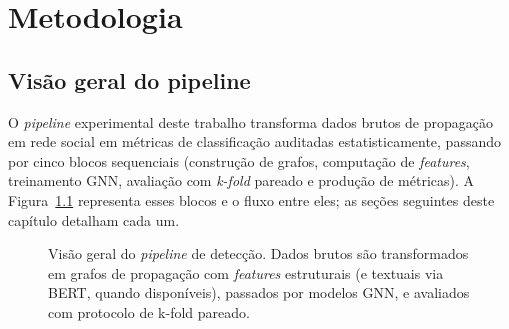 
\chapter{Metodologia}
\label{cap:metodologia}

\section{Vis\~ao geral do pipeline}
\label{sec:pipeline}

O \emph{pipeline} experimental deste trabalho transforma dados brutos
de propaga\c{c}\~ao em rede social em m\'etricas de classifica\c{c}\~ao
auditadas estatisticamente, passando por cinco blocos sequenciais
(constru\c{c}\~ao de grafos, computa\c{c}\~ao de \emph{features},
treinamento GNN, avalia\c{c}\~ao com \emph{k-fold} pareado e produ\c{c}\~ao
de m\'etricas). A Figura~\ref{fig:pipeline} representa esses blocos
e o fluxo entre eles; as se\c{c}\~oes seguintes deste cap\'itulo
detalham cada um.

\begin{figure}[H]\centering
{}
\caption{Vis\~ao geral do \emph{pipeline} de detec\c{c}\~ao. Dados brutos s\~ao
transformados em grafos de propaga\c{c}\~ao com \emph{features} estruturais
(e textuais via BERT, quando dispon\'iveis), passados por modelos GNN, e
avaliados com protocolo de k-fold pareado.}
\label{fig:pipeline}
\end{figure}

